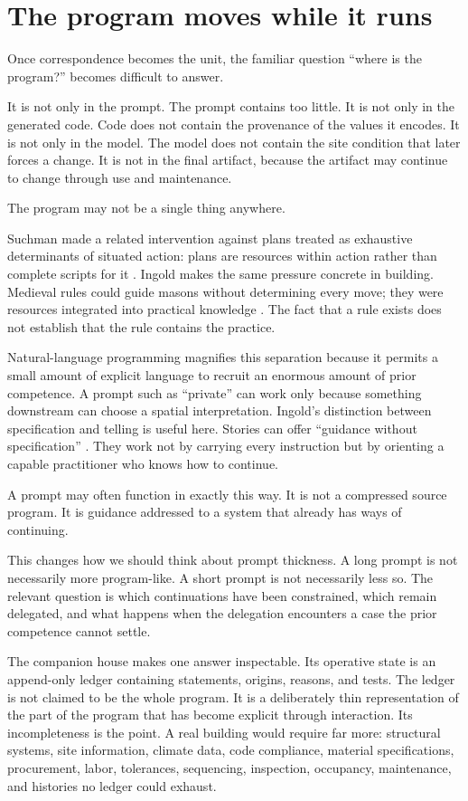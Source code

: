 \documentclass[11pt]{article}
\begin{document}
\section{The program moves while it runs}

Once correspondence becomes the unit, the familiar question ``where is the program?'' becomes difficult to answer.

It is not only in the prompt. The prompt contains too little. It is not only in the generated code. Code does not contain the provenance of the values it encodes. It is not only in the model. The model does not contain the site condition that later forces a change. It is not in the final artifact, because the artifact may continue to change through use and maintenance.

The program may not be a single thing anywhere.

Suchman made a related intervention against plans treated as exhaustive determinants of situated action: plans are resources within action rather than complete scripts for it \citep{suchman1987plans}. Ingold makes the same pressure concrete in building. Medieval rules could guide masons without determining every move; they were resources integrated into practical knowledge \citep[54--57]{ingold2013making}. The fact that a rule exists does not establish that the rule contains the practice.

Natural-language programming magnifies this separation because it permits a small amount of explicit language to recruit an enormous amount of prior competence. A prompt such as ``private'' can work only because something downstream can choose a spatial interpretation. Ingold's distinction between specification and telling is useful here. Stories can offer ``guidance without specification'' \citep[110--111]{ingold2013making}. They work not by carrying every instruction but by orienting a capable practitioner who knows how to continue.

A prompt may often function in exactly this way. It is not a compressed source program. It is guidance addressed to a system that already has ways of continuing.

This changes how we should think about prompt thickness. A long prompt is not necessarily more program-like. A short prompt is not necessarily less so. The relevant question is which continuations have been constrained, which remain delegated, and what happens when the delegation encounters a case the prior competence cannot settle.

The companion house makes one answer inspectable. Its operative state is an append-only ledger containing statements, origins, reasons, and tests. The ledger is not claimed to be the whole program. It is a deliberately thin representation of the part of the program that has become explicit through interaction. Its incompleteness is the point. A real building would require far more: structural systems, site information, climate data, code compliance, material specifications, procurement, labor, tolerances, sequencing, inspection, occupancy, maintenance, and histories no ledger could exhaust.
\end{document}
